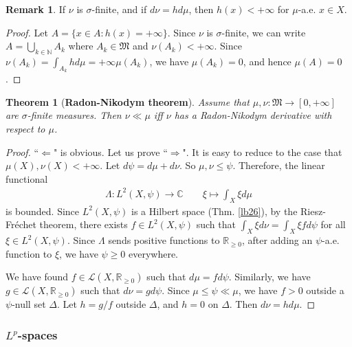 \documentclass[12pt,b5paper,notitlepage]{article}
\theoremstyle{definition}
\newtheorem{rem}[df]{Remark}
\theoremstyle{plain}
\newtheorem{thm}[df]{Theorem}
\newcommand{\fk}{\mathfrak}
\newcommand{\mc}{\mathcal}
\newcommand{\Cbb}{\mathbb C}
\newcommand{\Nbb}{\mathbb N}
\newcommand{\Rbb}{\mathbb R}
\numberwithin{equation}{section}
\begin{document}
\begin{rem}
If $\nu$ is $\sigma$-finite, and if $d\nu=hd\mu$, then $h(x)<+\infty$ for $\mu$-a.e. $x\in X$. 
\end{rem}

\begin{proof}
Let $A=\{x\in A:h(x)=+\infty\}$. Since $\nu$ is $\sigma$-finite, we can write $A=\bigcup_{k\in\Nbb}A_k$ where $A_k\in\fk M$ and $\nu(A_k)<+\infty$. Since $\nu(A_k)=\int_{A_k}hd\mu=+\infty \mu(A_k)$, we have $\mu(A_k)=0$, and hence $\mu(A)=0$.
\end{proof}





\begin{thm}[\textbf{Radon-Nikodym theorem}]\label{lb27} 
Assume that $\mu,\nu:\fk M\rightarrow[0,+\infty]$ are $\sigma$-finite measures. Then $\nu\ll\mu$ iff $\nu$ has a Radon-Nikodym derivative with respect to $\mu$.
\end{thm}


\begin{proof}[Proof]
``$\Leftarrow$" is obvious. Let us prove ``$\Rightarrow$". It is easy to reduce to the case that $\mu(X),\nu(X)<+\infty$. Let $d\psi=d\mu+d\nu$. So $\mu,\nu\leq\psi$. Therefore, the linear functional
\begin{gather*}
\Lambda: L^2(X,\psi)\rightarrow\Cbb\qquad \xi\mapsto \int_X \xi d\mu
\end{gather*}
is bounded. Since $L^2(X,\psi)$ is a Hilbert space (Thm. \ref{lb26}), by the Riesz-Fr\'echet theorem, there exists $f\in L^2(X,\psi)$ such that $\int_X\xi d\nu=\int_X \xi fd\psi$ for all $\xi\in L^2(X,\psi)$. Since $\Lambda$ sends positive functions to $\Rbb_{\geq0}$, after adding an $\psi$-a.e. function to $\xi$, we have $\psi\geq0$ everywhere.


We have found $f\in\mc L(X,\Rbb_{\geq0})$ such that $d\mu=fd\psi$. Similarly, we have $g\in\mc L(X,\Rbb_{\geq0})$ such that $d\nu=gd\psi$.  Since $\mu\leq\psi \ll \mu$, we have $f>0$ outside a $\psi$-null set $\Delta$. Let $h=g/f$ outside $\Delta$, and $h=0$ on $\Delta$. Then $d\nu=hd\mu$. 
\end{proof}












\subsubsection{$L^p$-spaces}
\end{document}
